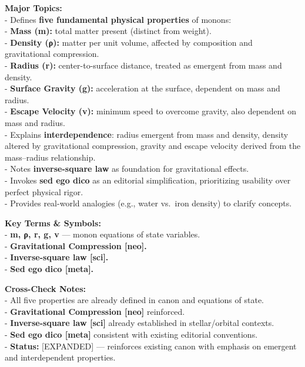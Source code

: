 \documentclass[
  letterpaper,
]{book}
\begin{document}
\textbf{Major Topics:}\\
- Defines \textbf{five fundamental physical properties} of monons:\\
- \textbf{Mass (m):} total matter present (distinct from weight).\\
- \textbf{Density (ρ):} matter per unit volume, affected by composition
and gravitational compression.\\
- \textbf{Radius (r):} center-to-surface distance, treated as emergent
from mass and density.\\
- \textbf{Surface Gravity (g):} acceleration at the surface, dependent
on mass and radius.\\
- \textbf{Escape Velocity (v):} minimum speed to overcome gravity, also
dependent on mass and radius.\\
- Explains \textbf{interdependence}: radius emergent from mass and
density, density altered by gravitational compression, gravity and
escape velocity derived from the mass--radius relationship.\\
- Notes \textbf{inverse-square law} as foundation for gravitational
effects.\\
- Invokes \textbf{sed ego dico} as an editorial simplification,
prioritizing usability over perfect physical rigor.\\
- Provides real-world analogies (e.g., water vs.~iron density) to
clarify concepts.

\textbf{Key Terms \& Symbols:}\\
- \textbf{m, ρ, r, g, v} --- monon equations of state variables.\\
- \textbf{Gravitational Compression {[}neo{]}.}\\
- \textbf{Inverse-square law {[}sci{]}.}\\
- \textbf{Sed ego dico {[}meta{]}.}

\textbf{Cross-Check Notes:}\\
- All five properties are already defined in canon and equations of
state.\\
- \textbf{Gravitational Compression {[}neo{]}} reinforced.\\
- \textbf{Inverse-square law {[}sci{]}} already established in
stellar/orbital contexts.\\
- \textbf{Sed ego dico {[}meta{]}} consistent with existing editorial
conventions.\\
- \textbf{Status:} {[}EXPANDED{]} --- reinforces existing canon with
emphasis on emergent and interdependent properties.
\end{document}
